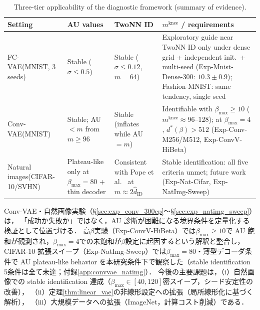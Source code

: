 \documentclass[11pt,a4paper]{jsarticle}
\newcommand{\mknee}{m^{\mathrm{knee}}}
\begin{document}
\begin{table}[H]
\centering
\caption{Three-tier applicability of the diagnostic framework (summary of evidence).}
\label{tab:applicability}
\small
\begin{tabular}{p{2.8cm}p{3.2cm}p{3.4cm}p{5.2cm}}
\toprule
Setting & AU values & TwoNN ID & $\mknee$ / requirements \\
\midrule
FC-VAE\newline (MNIST, 3 seeds) & Stable ($\sigma \leq 0.5$) & Stable ($\sigma \leq 0.12$, $m=64$) &
Exploratory guide near TwoNN ID only under dense grid + independent init.\ + multi-seed
(Exp-Mnist-Dense-300: $10.3 \pm 0.9$); Fashion-MNIST: same tendency, single seed \\
\addlinespace
Conv-VAE\newline (MNIST) & Stable; AU$<m$ from $m \geq 96$ & Stable (inflates while AU$=m$) &
Identifiable with $\beta_{\max} \geq 10$ ($\mknee \approx 96$--128); at $\beta_{\max}=4$, $d^*(\beta) > 512$
(Exp-Conv-M256/M512, Exp-ConvV-HiBeta) \\
\addlinespace
Natural images\newline (CIFAR-10/SVHN) & Plateau-like only at $\beta_{\max}=80$ + thin decoder & Consistent with Pope et al.\ \cite{pope2021intrinsic} at $m \approx 2\hat{d}_\mathrm{ID}$ &
Stable identification: all five criteria unmet; future work
(Exp-Nat-Cifar, Exp-NatImg-Sweep) \\
\bottomrule
\end{tabular}
\end{table}

Conv-VAE・自然画像実験（§\ref{sec:exp_conv_300ep}〜§\ref{sec:exp_natimg_sweep}）は，
「成功か失敗か」ではなく，AU 診断が困難になる境界条件を定量化する検証として位置づける．
高$\beta$実験（Exp-ConvV-HiBeta）では$\beta_{\max} \geq 10$で AU 飽和が観測され，$\beta_{\max}=4$での未飽和が$\beta$設定に起因するという解釈と整合し，
CIFAR-10 拡張スイープ（Exp-NatImg-Sweep）では$\beta_{\max}=80$・薄型デコーダ条件で
AU plateau-like behavior を本研究条件下で観察した（stable identification 5条件は全て未達；付録\ref{app:convvae_natimg}）．
今後の主要課題は，（i）自然画像での stable identification 達成（$\beta_{\max} \in [40,120]$密スイープ，シード安定性の改善），
（ii）定理\ref{thm:linear_vae}の非線形設定への拡張（局所線形化に基づく解析），
（iii）大規模データへの拡張（ImageNet，計算コスト削減）である．
\end{document}
